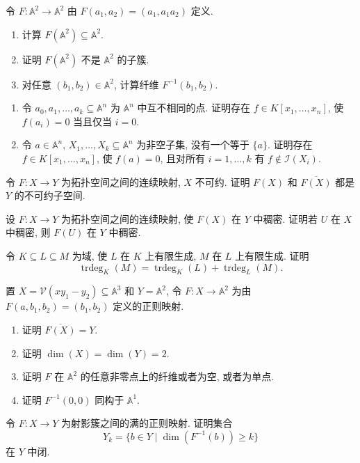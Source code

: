 \BookExerciseHeading
\begin{BookExercises}
  \item\label{ex:image-of-affine-polynomial-map-not-quasiprojective} 令 $F:\mathbb{A}^{2}\to\mathbb{A}^{2}$ 由 $F(a_{1},a_{2})=(a_{1},a_{1}a_{2})$ 定义.
  \begin{enumerate}
    \item 计算 $F(\mathbb{A}^{2})\subseteq\mathbb{A}^{2}$.
    \item 证明 $F(\mathbb{A}^{2})$ 不是 $\mathbb{A}^{2}$ 的子簇.
    \item 对任意 $(b_{1},b_{2})\in\mathbb{A}^{2}$, 计算纤维 $F^{-1}(b_{1},b_{2})$.
  \end{enumerate}
  \item\label{ex:choose-polynomial-vanishing-at-point-not-on-components}
  \begin{enumerate}
    \item 令 $a_{0},a_{1},\ldots,a_{k}\subseteq\mathbb{A}^{n}$ 为 $\mathbb{A}^{n}$ 中互不相同的点. 证明存在 $f\in K[x_{1},\ldots,x_{n}]$, 使 $f(a_{i})=0$ 当且仅当 $i=0$.
    \item 令 $a\in\mathbb{A}^{n}$, $X_{1},\ldots,X_{k}\subseteq\mathbb{A}^{n}$ 为非空子集, 没有一个等于 $\{a\}$. 证明存在 $f\in K[x_{1},\ldots,x_{n}]$, 使 $f(a)=0$, 且对所有 $i=1,\ldots,k$ 有 $f\notin\mathcal{I}(X_{i})$.
  \end{enumerate}
  \item\label{ex:image-and-closure-of-irreducible-space-are-irreducible} 令 $F:X\to Y$ 为拓扑空间之间的连续映射, $X$ 不可约. 证明 $F(X)$ 和 $\overline{F(X)}$ 都是 $Y$ 的不可约子空间.
  \item\label{ex:continuous-map-with-dense-image-maps-dense-subsets-to-dense-subsets} 设 $F:X\to Y$ 为拓扑空间之间的连续映射, 使 $F(X)$ 在 $Y$ 中稠密. 证明若 $U$ 在 $X$ 中稠密, 则 $F(U)$ 在 $Y$ 中稠密.
  \item\label{ex:transcendence-degrees-add-in-tower} 令 $K\subseteq L\subseteq M$ 为域, 使 $L$ 在 $K$ 上有限生成, $M$ 在 $L$ 上有限生成. 证明
  \[
    \operatorname{trdeg}_{K}(M)
    =\operatorname{trdeg}_{K}(L)+\operatorname{trdeg}_{L}(M).
  \]
  \item\label{ex:fibres-of-projection-from-affine-graph} 置 $X=\mathcal{V}(xy_{1}-y_{2})\subseteq\mathbb{A}^{3}$ 和 $Y=\mathbb{A}^{2}$, 令 $F:X\to\mathbb{A}^{2}$ 为由 $F(a,b_{1},b_{2})=(b_{1},b_{2})$ 定义的正则映射.
  \begin{enumerate}
    \item 证明 $\overline{F(X)}=Y$.
    \item 证明 $\dim(X)=\dim(Y)=2$.
    \item 证明 $F$ 在 $\mathbb{A}^{2}$ 的任意非零点上的纤维或者为空, 或者为单点.
    \item 证明 $F^{-1}(0,0)$ 同构于 $\mathbb{A}^{1}$.
  \end{enumerate}
  \item\label{ex:fibre-dimension-sets-closed-for-projective-maps} 令 $F:X\to Y$ 为射影簇之间的满的正则映射. 证明集合
  \[
    Y_{k}=\{b\in Y\mid\dim(F^{-1}(b))\ge k\}
  \]
  在 $Y$ 中闭.
\end{BookExercises}

